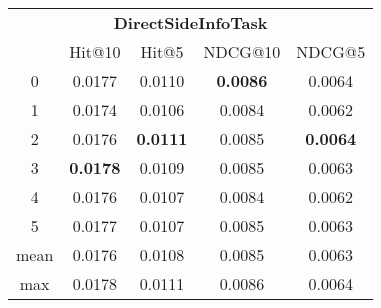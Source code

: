 \documentclass{article}
\begin{document}
 

\begin{tabular}{c|cccc}

\multicolumn{5}{c}{\textbf{DirectSideInfoTask}} \\
\noalign{\smallskip}
\noalign{\smallskip}
\toprule
\multicolumn{1}{c}{Template ID} & \multicolumn{1}{|c}{Hit@10} & \multicolumn{1}{c}{Hit@5} & \multicolumn{1}{c}{NDCG@10} & \multicolumn{1}{c}{NDCG@5} \\
\midrule
0 & 0.0177 & 0.0110 & \textbf{0.0086} & 0.0064 \\
1 & 0.0174 & 0.0106 & 0.0084 & 0.0062 \\
2 & 0.0176 & \textbf{0.0111} & 0.0085 & \textbf{0.0064} \\
3 & \textbf{0.0178} & 0.0109 & 0.0085 & 0.0063 \\
4 & 0.0176 & 0.0107 & 0.0084 & 0.0062 \\
5 & 0.0177 & 0.0107 & 0.0085 & 0.0063 \\
\midrule
mean & 0.0176 & 0.0108 & 0.0085 & 0.0063 \\
max & 0.0178 & 0.0111 & 0.0086 & 0.0064 \\
\bottomrule

\end{tabular}
\end{document}
